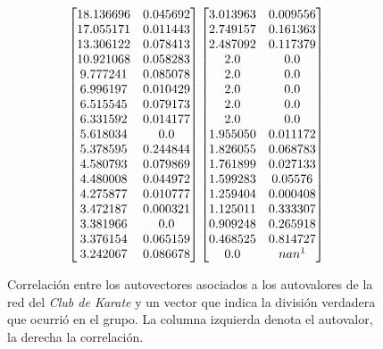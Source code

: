 \vspace{1em}
\begin{figure}[!htbp]
\begin{equation*} 
    \begin{bmatrix}
        18.136696 & 0.045692 \\
        17.055171 & 0.011443 \\
        13.306122 & 0.078413 \\
        10.921068 & 0.058283 \\
        9.777241  & 0.085078 \\
        6.996197  & 0.010429 \\
        6.515545  & 0.079173 \\
        6.331592  & 0.014177 \\
        5.618034  & 0.0 \\
        5.378595  & 0.244844 \\
        4.580793  & 0.079869 \\
        4.480008  & 0.044972 \\
        4.275877  & 0.010777 \\
        3.472187  & 0.000321 \\
        3.381966  & 0.0 \\
        3.376154  & 0.065159 \\
        3.242067  & 0.086678 \\
    \end{bmatrix}
    \begin{bmatrix}
        3.013963 & 0.009556 \\
        2.749157 & 0.161363 \\
        2.487092 & 0.117379 \\
        2.0 & 0.0 \\
        2.0 & 0.0 \\
        2.0 & 0.0 \\
        2.0 & 0.0 \\
        2.0 & 0.0 \\
        1.955050 & 0.011172 \\
        1.826055 & 0.068783 \\
        1.761899 & 0.027133 \\
        1.599283 & 0.05576 \\
        1.259404 & 0.000408 \\
        1.125011 & 0.333307 \\
        0.909248 & 0.265918 \\
        0.468525 & 0.814727 \\
        0.0 & nan\footnotemark \\
    \end{bmatrix}
\end{equation*}
\caption{Correlación entre los autovectores asociados a los autovalores de la red del \textit{Club de Karate} y un vector que indica la división verdadera que ocurrió en el grupo. La columna izquierda denota el autovalor, la derecha la correlación.} \label{conectividad_karate}
\end{figure}
